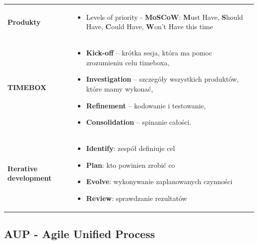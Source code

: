 \documentclass[a4paper]{article}
\begin{document}
    \begin{table}[H]
        \begin{center}
            \begin{tabular}{ p{2.5cm} p{13.5cm}}
                \textbf{Produkty}
                &
                \begin{itemize}
                    \item Levels of priority - \textbf{MoSCoW}: \textbf{M}ust Have,
                    \textbf{S}hould Have, \textbf{C}ould Have, \textbf{W}on’t Have this time
                \end{itemize}
                \\

                \textbf{TIMEBOX}
                &
                \begin{itemize}
                    \item \textbf{Kick-off} – krótka sesja, która ma pomoc zrozumieniu celu timeboxa,
                    \item \textbf{Investigation} – szczegóły wszystkich produktów, które mamy wykonać,
                    \item \textbf{Refinement} – kodowanie i testowanie,
                    \item \textbf{Consolidation} – spinanie całości.
                \end{itemize}
                \\

                \textbf{Iterative development}
                &
                \begin{itemize}
                    \item \textbf{Identify}: zespół definiuje cel
                    \item \textbf{Plan}: kto powinien zrobić co
                    \item \textbf{Evolve}: wykonywanie
                    zaplanowanych czynności
                    \item \textbf{Review}: sprawdzanie rezultatów
                \end{itemize}
            \end{tabular}
        \end{center}
    \end{table}


    \subsection{AUP - Agile Unified Process}
\end{document}
